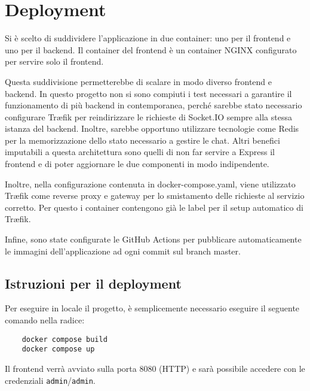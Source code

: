 \documentclass{report}
\begin{document}
\section{Deployment}
\par Si è scelto di suddividere l'applicazione in due container: uno per il frontend e uno per il backend. Il container del frontend è un container NGINX configurato per servire solo il frontend.
\par Questa suddivisione permetterebbe di scalare in modo diverso frontend e backend. In questo progetto non si sono compiuti i test necessari a garantire il funzionamento di più backend in contemporanea, perché sarebbe stato necessario configurare Træfik per reindirizzare le richieste di Socket.IO sempre alla stessa istanza del backend. Inoltre, sarebbe opportuno utilizzare tecnologie come Redis per la memorizzazione dello stato necessario a gestire le chat. Altri benefici imputabili a questa architettura sono quelli di non far servire a Express il frontend e di poter aggiornare le due componenti in modo indipendente.
\par Inoltre, nella configurazione contenuta in docker-compose.yaml, viene utilizzato Træfik come reverse proxy e gateway per lo smistamento delle richieste al servizio corretto. Per questo i container contengono già le label per il setup automatico di Træfik.
\par Infine, sono state configurate le GitHub Actions per pubblicare automaticamente le immagini dell'applicazione ad ogni commit sul branch master.
\subsection{Istruzioni per il deployment}
\par Per eseguire in locale il progetto, è semplicemente necessario eseguire il seguente comando nella radice:
\begin{verbatim}
    docker compose build
    docker compose up
\end{verbatim}
\par Il frontend verrà avviato sulla porta 8080 (HTTP) e sarà possibile accedere con le credenziali \texttt{admin}/\texttt{admin}.
\end{document}
